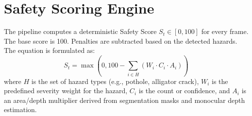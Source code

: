 \section{Safety Scoring Engine}
The pipeline computes a deterministic Safety Score $S_t \in [0, 100]$ for every frame. The base score is 100. Penalties are subtracted based on the detected hazards. The equation is formulated as:
\begin{equation}
    S_t = \max \left( 0, 100 - \sum_{i \in H} (W_i \cdot C_i \cdot A_i) \right)
\end{equation}
where $H$ is the set of hazard types (e.g., pothole, alligator crack), $W_i$ is the predefined severity weight for the hazard, $C_i$ is the count or confidence, and $A_i$ is an area/depth multiplier derived from segmentation masks and monocular depth estimation.

\lipsum[13-18] %
